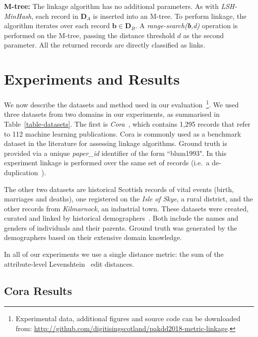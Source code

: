 \documentclass{llncs}
\begin{document}
\textbf{M-tree:} The linkage algorithm has no additional parameters. As
with \emph{LSH-MinHash}, each record in $\mathbf{D}_A$ is inserted into
an M-tree. To perform linkage, the algorithm iterates over each record
$\mathbf{b} \in \mathbf{D}_B$. A \emph{range-search(\textbf{b},d)}
operation is performed on the M-tree, passing the distance threshold $d$
as the second parameter. All the returned records are directly
classified as links.


\section{Experiments and Results}
\label{sec-exp}

We now describe the datasets and method used in our
evaluation~\footnote{Experimental data, additional figures and source
code can be downloaded from:
\url{http://github.com/digitisingscotland/pakdd2018-metric-linkage}.}.
We used three datasets from two domains in our experiments, as
summarised in Table~\ref{table-datasets}. The first is
\emph{Cora}~\cite{Cora2017}, which contains 1,295 records that refer to
112 machine learning publications. Cora is commonly used as a benchmark
dataset in the literature for assessing linkage algorithms. Ground truth
is provided via a unique \emph{paper\_id} identifier of the form
``blum1993". In this experiment linkage is performed over the same set
of records (i.e.\ a de-duplication~\cite{Chr12}).

The other two datasets are historical Scottish records of vital events
(birth, marriages and deaths), one registered on the \emph{Isle of
Skye}, a rural district, and the other records from \emph{Kilmarnock},
an industrial town. These datasets were created, curated and linked by
historical demographers~\cite{reid2006,reid2002}. Both include the names
and genders of individuals and their parents. Ground truth was generated
by the demographers based on their extensive domain knowledge.

In all of our experiments we use a single distance metric: the sum of
the attribute-level Levenshtein~\cite{Levenshtein66} edit distances.


\subsection{Cora Results}
\end{document}
